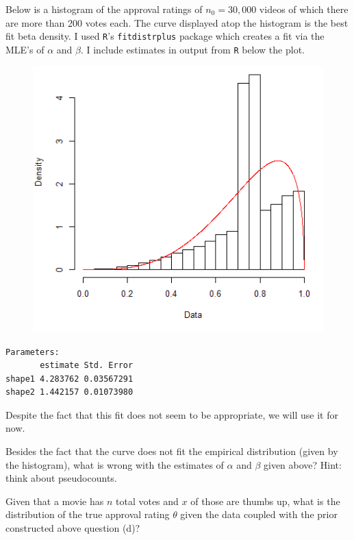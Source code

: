 \documentclass[12pt]{article}
\begin{document}
Below is a histogram of the approval ratings of $n_0 = 30,000$ videos of which there are more than 200 votes each. The curve displayed atop the histogram is the best fit beta density. I used \texttt{R}'s  \texttt{fitdistrplus} package which creates a fit via the MLE's of $\alpha$ and $\beta$. I include estimates in output from \texttt{R} below the plot. 

\begin{figure}[htp]
\centering
\includegraphics[width=5in]{fitdist.png}
\end{figure}

\begin{verbatim}
Parameters:
       estimate Std. Error
shape1 4.283762 0.03567291
shape2 1.442157 0.01073980
\end{verbatim}

Despite the fact that this fit does not seem to be appropriate, we will use it for now.

 Besides the fact that the curve does not fit the empirical distribution (given by the histogram), what is wrong with the estimates of $\alpha$ and $\beta$ given above? Hint: think about pseudocounts.  %

 Given that a movie has $n$ total votes and $x$ of those are thumbs up, what is the distribution of the true approval rating $\theta$ given the data coupled with the prior constructed above question (d)? %
\end{document}
